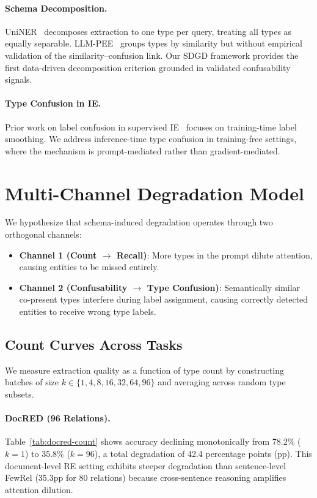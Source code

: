 \documentclass[11pt,a4paper]{article}
\begin{document}
\paragraph{Schema Decomposition.}
UniNER~\cite{zhou2024universalner} decomposes extraction to one type per query, treating all types as equally separable.
LLM-PEE~\cite{zhang2024llmpee} groups types by similarity but without empirical validation of the similarity--confusion link.
Our SDGD framework provides the first data-driven decomposition criterion grounded in validated confusability signals.

\paragraph{Type Confusion in IE.}
Prior work on label confusion in supervised IE~\cite{li2022rethinking} focuses on training-time label smoothing. We address inference-time type confusion in training-free settings, where the mechanism is prompt-mediated rather than gradient-mediated.


\section{Multi-Channel Degradation Model}
\label{sec:multi-channel}

We hypothesize that schema-induced degradation operates through two orthogonal channels:
\begin{itemize}
\item \textbf{Channel 1 (Count $\to$ Recall)}: More types in the prompt dilute attention, causing entities to be missed entirely.
\item \textbf{Channel 2 (Confusability $\to$ Type Confusion)}: Semantically similar co-present types interfere during label assignment, causing correctly detected entities to receive wrong type labels.
\end{itemize}

\subsection{Count Curves Across Tasks}

We measure extraction quality as a function of type count by constructing batches of size $k \in \{1, 4, 8, 16, 32, 64, 96\}$ and averaging across random type subsets.

\paragraph{DocRED (96 Relations).}
Table~\ref{tab:docred-count} shows accuracy declining monotonically from 78.2\% ($k=1$) to 35.8\% ($k=96$), a total degradation of 42.4 percentage points (pp). This document-level RE setting exhibits steeper degradation than sentence-level FewRel (35.3pp for 80 relations) because cross-sentence reasoning amplifies attention dilution.
\end{document}
